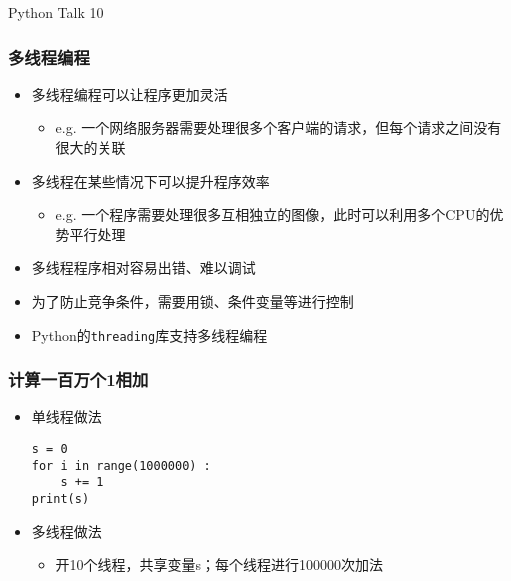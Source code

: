 



\PreFirstFrame
\begin{frame} [fragile]
	\centerline{\fontsize{42}{42}\selectfont Python Talk 10}
\end{frame}
\PostFirstFrame

\begin{frame}
	\frametitle{多线程编程}
	\begin{itemize}
	\item 多线程编程可以让程序更加灵活
		\begin{itemize}
		\item e.g. 一个网络服务器需要处理很多个客户端的请求，但每个请求之间没有很大的关联
		\end{itemize}
	\item 多线程在某些情况下可以提升程序效率
		\begin{itemize}
		\item e.g. 一个程序需要处理很多互相独立的图像，此时可以利用多个CPU的优势平行处理
		\end{itemize}
	\item 多线程程序相对容易出错、难以调试
	\item 为了防止竞争条件，需要用锁、条件变量等进行控制
	\item Python的\texttt{threading}库支持多线程编程
	\end{itemize}
\end{frame}

\begin{frame} [fragile]
	\frametitle{计算一百万个1相加}
	\begin{itemize}
	\item 单线程做法
	\begin{lstlisting}[style=pythonstyle, gobble=0]
s = 0
for i in range(1000000) :
	s += 1
print(s)
	\end{lstlisting}
	\item 多线程做法
		\begin{itemize}
		\item 开10个线程，共享变量s；每个线程进行100000次加法
		\end{itemize}
	\end{itemize}
\end{frame}

